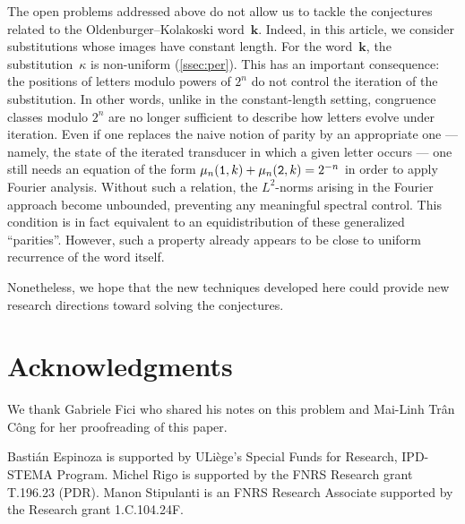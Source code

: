 \documentclass[12pt,reqno]{article}
\begin{document}
    The open problems addressed above do not allow us to tackle the conjectures related to the Oldenburger--Kolakoski word~$\mathbf{k}$. Indeed, in this article, we consider substitutions whose images have constant length. For the word~$\mathbf{k}$, the substitution~$\kappa$ is non-uniform (\cref{ssec:per}). This has an important consequence: the positions of letters modulo powers of $2^n$ do not control the iteration of the substitution. In other words, unlike in the constant-length setting, congruence classes modulo $2^n$ are no longer sufficient to describe how letters evolve under iteration. Even if one replaces the naive notion of parity by an appropriate one --- namely, the state of the iterated transducer in which a given letter occurs --- one still needs an equation of the form $\mu_n({\tt 1},k)+\mu_n({\tt 2},k)=2^{-n}$ in order to apply Fourier analysis. Without such a relation, the $L^2$-norms arising in the Fourier approach become unbounded, preventing any meaningful spectral control. This condition is in fact equivalent to an equidistribution of these generalized ``parities''. However, such a property already appears to be close to uniform recurrence of the word itself.

    Nonetheless, we hope that the new techniques developed here could provide new research directions toward solving the conjectures.
\section*{Acknowledgments}

We thank Gabriele Fici who shared his notes on this problem and Mai-Linh Trân Công for her proofreading of this paper.  

Bastián Espinoza is supported by ULiège's Special Funds for Research, IPD-STEMA Program.
Michel Rigo is supported by the FNRS Research grant T.196.23 (PDR). 
Manon Stipulanti is an FNRS Research Associate supported by the Research grant 1.C.104.24F. 




\end{document}
